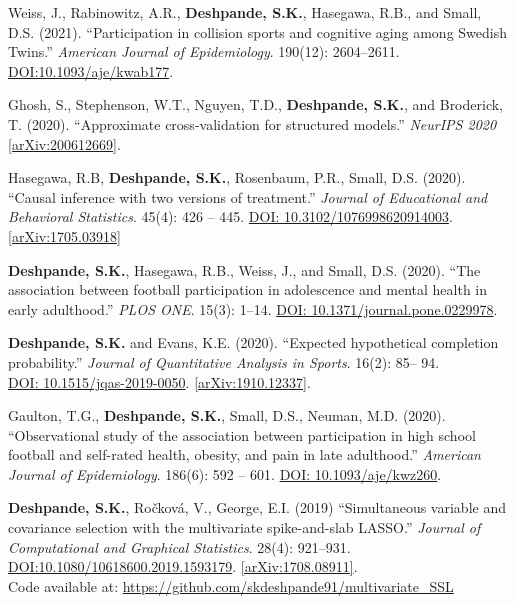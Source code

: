 \documentclass[margin]{res}
\begin{document}
\begin{resume}
Weiss, J., Rabinowitz, A.R., \textbf{Deshpande, S.K.}, Hasegawa, R.B., and Small, D.S. (2021). ``Participation in collision sports and cognitive aging among Swedish Twins.'' \textit{American Journal of Epidemiology}. 190(12): 2604--2611. \href{https://doi.org/10.1093/aje/kwab177}{DOI:10.1093/aje/kwab177}.

Ghosh, S., Stephenson, W.T., Nguyen, T.D., \textbf{Deshpande, S.K.}, and Broderick, T. (2020). ``Approximate cross-validation for structured models.'' \textit{NeurIPS 2020} \href{https://arxiv.org/abs/2006.12669}{[arXiv:200612669]}. 

Hasegawa, R.B, \textbf{Deshpande, S.K.}, Rosenbaum, P.R., Small, D.S. (2020). ``Causal inference with two versions of treatment.'' \textit{Journal of Educational and Behavioral Statistics}. 45(4): 426 -- 445. \href{https://doi.org/10.3102/1076998620914003}{DOI: 10.3102/1076998620914003}. \href{https://arxiv.org/abs/1705.03918}{[arXiv:1705.03918]}

\textbf{Deshpande, S.K.}, Hasegawa, R.B., Weiss, J., and Small, D.S. (2020). ``The association between football participation in adolescence and mental health in early adulthood.'' \textit{PLOS ONE}. 15(3): 1--14. \href{https://doi.org/10.1371/journal.pone.0229978}{DOI: 10.1371/journal.pone.0229978}.

\textbf{Deshpande, S.K.} and Evans, K.E. (2020). ``Expected hypothetical completion probability.'' \textit{Journal of Quantitative Analysis in Sports}. 16(2): 85-- 94.\\ \href{https://doi.org/10.1515/jqas-2019-0050}{DOI: 10.1515/jqas-2019-0050}. \href{https://arxiv.org/abs/1910.12337}{[arXiv:1910.12337]}.

Gaulton, T.G., \textbf{Deshpande, S.K.}, Small, D.S., Neuman, M.D. (2020). ``Observational study of the association between participation in high school football and self-rated health, obesity, and pain in late adulthood.'' \textit{American Journal of Epidemiology}. 186(6): 592 -- 601. \href{https://doi.org/10.1093/aje/kwz260}{DOI: 10.1093/aje/kwz260}.

\textbf{Deshpande, S.K.}, Ro\v{c}kov\'{a}, V.,  George, E.I. (2019) ``Simultaneous variable and covariance selection with the multivariate spike-and-slab LASSO.'' \textit{Journal of Computational and Graphical Statistics}. 28(4): 921--931. \href{https://doi.org/10.1080/10618600.2019.1593179}{DOI:10.1080/10618600.2019.1593179}. \href{https://arxiv.org/abs/1708.08911}{[arXiv:1708.08911]}. \\ Code available at: \url{https://github.com/skdeshpande91/multivariate_SSL}


\end{resume}
\end{document}
